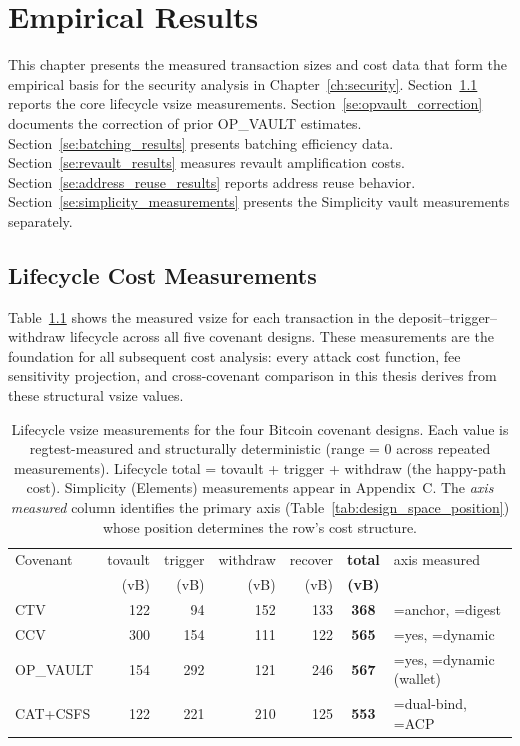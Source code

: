\chapter{Empirical Results} \label{ch:results}

This chapter presents the measured transaction sizes and cost data that form the
empirical basis for the security analysis in Chapter~\ref{ch:security}.
Section~\ref{se:lifecycle_measurements} reports the core lifecycle vsize measurements.
Section~\ref{se:opvault_correction} documents the correction of prior OP\_VAULT
estimates. Section~\ref{se:batching_results} presents batching efficiency data.
Section~\ref{se:revault_results} measures revault amplification costs.
Section~\ref{se:address_reuse_results} reports address reuse behavior.
Section~\ref{se:simplicity_measurements} presents the Simplicity vault measurements
separately.

\section{Lifecycle Cost Measurements} \label{se:lifecycle_measurements}

Table~\ref{tab:lifecycle} shows the measured vsize for each transaction in the
deposit--trigger--withdraw lifecycle across all five covenant designs. These
measurements are the foundation for all subsequent cost analysis: every attack cost
function, fee sensitivity projection, and cross-covenant comparison in this thesis
derives from these structural vsize values.

\begin{table}[t]
\centering
\caption{Lifecycle vsize measurements for the four Bitcoin
covenant designs. Each value is regtest-measured and structurally
deterministic (range = 0 across repeated measurements). Lifecycle
total = tovault + trigger + withdraw (the happy-path cost). Simplicity
(Elements) measurements appear in Appendix~C. The \emph{axis measured}
column identifies the primary axis
(Table~\ref{tab:design_space_position}) whose position determines the
row's cost structure.}
\label{tab:lifecycle}
\begin{tabular}{@{}lrrrrcl@{}}
\toprule
Covenant & tovault & trigger & withdraw & recover & \textbf{total}  & axis measured                                                 \\
         & (vB)    & (vB)    & (vB)     & (vB)    & \textbf{(vB)}   &                                                               \\
\midrule
CTV        & 122 &  94 & 152 & 133 & \textbf{368} & \axfee{}=anchor, \axwdbind{}=digest          \\
CCV        & 300 & 154 & 111 & 122 & \textbf{565} & \axrevault{}=yes, \axfee{}=dynamic           \\
OP\_VAULT  & 154 & 292 & 121 & 246 & \textbf{567} & \axrevault{}=yes, \axfee{}=dynamic (wallet)  \\
CAT+CSFS   & 122 & 221 & 210 & 125 & \textbf{553} & \axwdbind{}=dual-bind, \axfee{}=ACP          \\
\bottomrule
\end{tabular}
\end{table}


